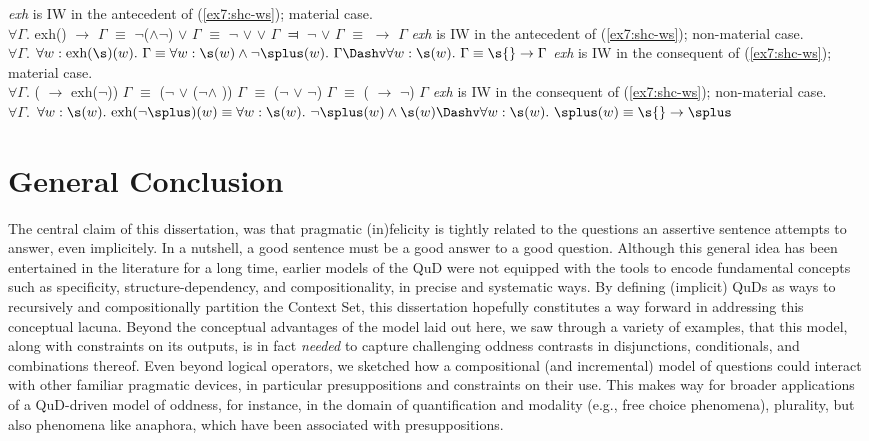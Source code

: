 \begin{exe}
	\ex\label{ex7:hc-s-ws-iw}
	\begin{xlist}
		\ex\textit{exh} is IW in the antecedent of (\ref{ex7:shc-ws}); material case.\\ $\forall \Gamma.$ exh(\s) $\rightarrow$ $\Gamma$ $\equiv$ $\neg$(\s$\wedge$$\neg$\splus) $\vee$ $\Gamma$ $\equiv$ $\neg$\s{} $\vee$ \splus{} $\vee$ $\Gamma$ $\Dashv$ $\neg$\s{} $\vee$ $\Gamma$ $\equiv$ \s{} $\rightarrow$ $\Gamma$
		\ex\textit{exh} is IW in the antecedent of (\ref{ex7:shc-ws}); non-material case.\\ $\forall \Gamma.$ $\forall w: \text{exh}(\s)(w). \ \Gamma \equiv \forall w: \s(w) \wedge \neg\splus(w). \ \Gamma \Dashv \forall w: \s(w). \ \Gamma \equiv \s{} \rightarrow \Gamma$
		\ex\textit{exh} is IW in the consequent of (\ref{ex7:shc-ws}); material case.\\
		$\forall \Gamma.$ (\s{} $\rightarrow$ exh($\neg$\splus)) $\Gamma$ $\equiv$ ($\neg$\s{} $\vee$ ($\neg$\splus $\wedge$ \s)) $\Gamma$ $\equiv$ ($\neg$\s{} $\vee$ $\neg$\splus) $\Gamma$ $\equiv$ (\s{} $\rightarrow$ $\neg$\splus) $\Gamma$
		\ex\textit{exh} is IW in the consequent of (\ref{ex7:shc-ws}); non-material case.\\$\forall \Gamma.$ $\forall w: \s(w). \ \text{exh}(\neg\splus)(w) \equiv \forall w: \s(w). \ \neg\splus(w) \wedge \s(w) \Dashv \forall w: \s(w). \ \splus(w) \equiv \s{} \rightarrow \splus$
	\end{xlist}
\end{exe}

\fi

\newpage
\section{General Conclusion}

The central claim of this dissertation, was that pragmatic (in)felicity is tightly related to the questions an assertive sentence attempts to answer, even implicitely. In a nutshell, a good sentence must be a good answer to a good question. Although this general idea has been entertained in the literature for a long time, earlier models of the QuD were not equipped with the tools to encode fundamental concepts such as specificity, structure-dependency, and compositionality, in precise and systematic ways. By defining (implicit) QuDs as ways to recursively and compositionally partition the Context Set, this dissertation hopefully constitutes a way forward in addressing this conceptual lacuna. Beyond the conceptual advantages of the model laid out here, we saw through a variety of examples, that this model, along with constraints on its outputs, is in fact \textit{needed} to capture challenging oddness contrasts in disjunctions, conditionals, and combinations thereof. Even beyond logical operators, we sketched how a compositional (and incremental) model of questions could interact with other familiar pragmatic devices, in particular presuppositions and constraints on their use. This makes way for broader applications of a QuD-driven model of oddness, for instance, in the domain of quantification and modality (e.g., free choice phenomena), plurality, but also phenomena like anaphora, which have been associated with presuppositions.